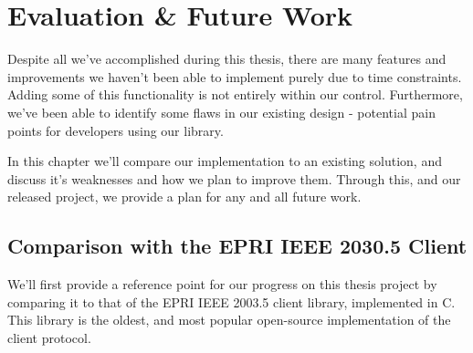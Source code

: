 \chapter{Evaluation \& Future Work}\label{ch:future}
Despite all we've accomplished during this thesis, there are many features and improvements we haven't been able to implement purely due to time constraints. Adding some of this functionality is not entirely within our control.
Furthermore, we've been able to identify some flaws in our existing design - potential pain points for developers using our library.

In this chapter we'll compare our implementation to an existing solution, and discuss it's weaknesses and how we plan to improve them. Through this, and our released project, we provide a plan for any and all future work.

\section{Comparison with the EPRI IEEE 2030.5 Client}
We'll first provide a reference point for our progress on this thesis project by comparing it to that of the EPRI IEEE 2003.5 client library, implemented in C.
This library is the oldest, and most popular open-source implementation of the client protocol.

